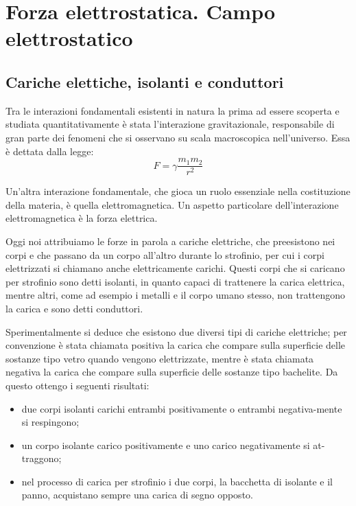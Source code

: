 \documentclass[class=book, crop=false, oneside, 12pt]{standalone}
\begin{document}
\chapter{Forza elettrostatica. Campo elettrostatico}

\section{Cariche elettiche, isolanti e conduttori}

Tra le interazioni fondamentali esistenti in natura la prima ad essere scoperta e studiata quantitativamente è stata l'interazione gravitazionale, responsabile di gran parte dei fenomeni che si osservano su scala macroscopica nell'universo.
Essa è dettata dalla legge:
\begin{equation}
    F = \gamma \frac{m_1 m_2}{r^2}
\end{equation}

Un'altra interazione fondamentale, che gioca un ruolo essenziale nella costituzione della materia, è quella elettromagnetica. 
Un aspetto particolare dell'interazione elettromagnetica è la forza elettrica.

Oggi noi attribuiamo le forze in parola a cariche elettriche, che preesistono nei corpi e che passano da un corpo all'altro durante lo strofinio, per cui i corpi elettrizzati si chiamano anche elettricamente carichi.
Questi corpi che si caricano per strofinio sono detti isolanti, in quanto capaci di trattenere la carica elettrica, mentre altri, come ad esempio i metalli e il corpo umano stesso, non trattengono la carica e sono detti conduttori.

Sperimentalmente si deduce che esistono due diversi tipi di cariche elettriche; per convenzione è stata chiamata positiva la carica che compare sulla superficie delle sostanze tipo vetro quando vengono elettrizzate, mentre è stata chiamata negativa la carica che compare sulla superficie delle sostanze tipo bachelite.
Da questo ottengo i seguenti risultati:
\begin{itemize}
    \item due corpi isolanti carichi entrambi positivamente o entrambi negativa-mente si respingono; 
    \item un corpo isolante carico positivamente e uno carico negativamente si  at-traggono; 
    \item nel processo di carica per strofinio i due corpi, la bacchetta di isolante e il panno, acquistano sempre una carica di segno opposto. 
\end{itemize}
\end{document}

